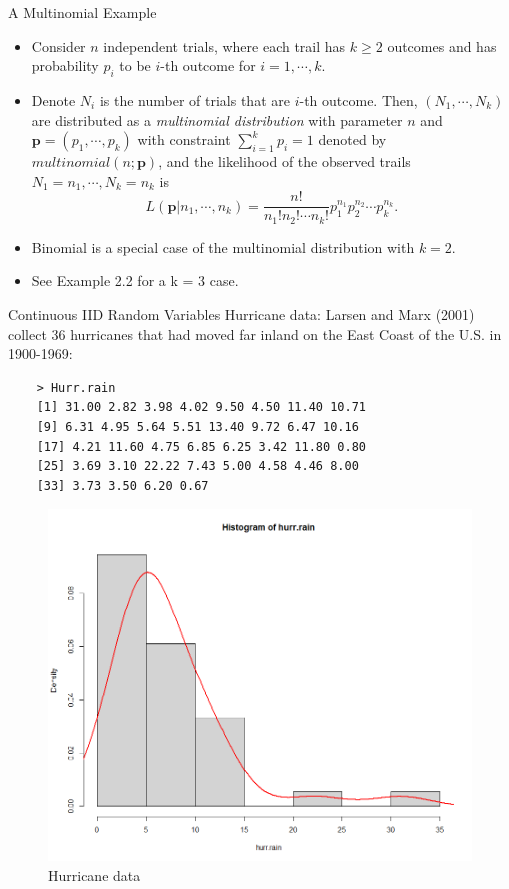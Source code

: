 \documentclass{beamer}
\begin{document}
\begin{frame}{A Multinomial Example}
        \begin{itemize}
            \item Consider $n$ independent trials, where each trail has $k \geq 2$ outcomes and has probability $p_{i}$ to be $i$-th outcome for $i = 1, \cdots, k$.
            \item Denote $N_{i}$ is the number of trials that are $i$-th outcome. Then, $(N_{1}, \cdots, N_{k})$ are distributed as a {\it multinomial distribution} with parameter $n$ and $ \textbf{p} = (p_{1}, \cdots, p_{k})$ with constraint $\sum^{k}_{i=1}p_{i} = 1$ denoted by $multinomial(n; \textbf{p} )$, and the likelihood of the observed trails $N_{1} = n_{1}, \cdots, N_{k} = n_{k}$ is 
            $$L(\textbf{p} | n_{1}, \cdots, n_{k}) = \frac{n!}{n_{1}!n_{2}!\cdots n_{k}!}p^{n_{1}}_{1} p^{n_{2}}_{2} \cdots p^{n_{k}}_{k}.$$
            \item  Binomial is a special case of the multinomial distribution with $k = 2.$
            \item See Example 2.2 for a k = 3 case. 
        \end{itemize}
    \end{frame}

    \begin{frame}[fragile]{Continuous IID Random Variables}
     Hurricane data: Larsen and Marx (2001) collect 36 hurricanes that had moved far inland on the East Coast of the U.S. in 1900-1969:

        
    \begin{lstlisting}
    > Hurr.rain 
    [1] 31.00 2.82 3.98 4.02 9.50 4.50 11.40 10.71 
    [9] 6.31 4.95 5.64 5.51 13.40 9.72 6.47 10.16 
    [17] 4.21 11.60 4.75 6.85 6.25 3.42 11.80 0.80
    [25] 3.69 3.10 22.22 7.43 5.00 4.58 4.46 8.00
    [33] 3.73 3.50 6.20 0.67
    \end{lstlisting}
    \begin{figure}
        \centering
        \includegraphics[width = 4 cm]{F1.png}
        \caption{Hurricane data}
    \end{figure}
    \end{frame}
    
\end{document}
